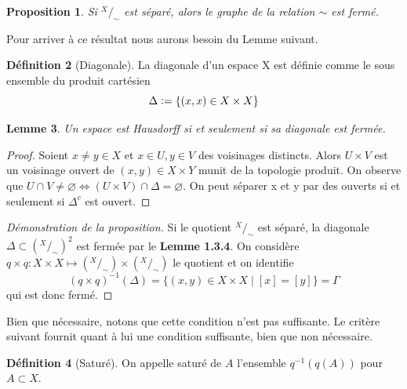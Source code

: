 \documentclass[12pt]{book}
\newcommand{\defeq}{\vcentcolon=}
\newtheorem{lemma}{Lemme}[section]
\newtheorem{prop}[lemma]{Proposition}
\theoremstyle{definition}
\newtheorem{definition}[lemma]{Définition}
\theoremstyle{remark}
\newcommand*\quot[2]{{^{\textstyle #1}\big/_{\textstyle #2}}}
\begin{document}
	\begin{prop}
		Si $\quot{X}{\sim}$ est séparé, alors le graphe de la relation  $\sim$ est fermé.
	\end{prop}
	Pour arriver à ce résultat nous aurons besoin du Lemme suivant.
	\begin{definition}[Diagonale]
		La diagonale d'un espace X est définie comme le sous ensemble du produit cartésien
	\[\Delta \defeq \{(x,x) \in X \times X\}\]
	\end{definition}
	\begin{lemma}
		Un espace est Hausdorff si et seulement si sa diagonale est fermée.
	\end{lemma}
	\begin{proof}
		Soient $x \neq y \in X$ et  $x \in U, y \in V$ des voisinages distincts. Alors  $U\times V$ est un voisinage ouvert de  $(x,y) \in X\times Y$ munit de la topologie produit. On observe que  $U\cap V \neq \varnothing \iff (U\times V) \cap \Delta = \varnothing$. On peut séparer x et y par des ouverts si et seulement si $\Delta^c$ est ouvert.
	\end{proof}
	\begin{proof}[Démonstration de la proposition]
		Si le quotient $\quot{X}{\sim}$ est séparé, la diagonale $\Delta \subset (\quot{X}{\sim})^2$ est fermée par le \textbf{Lemme 1.3.4}. On considère $q\times q : X \times X \longmapsto (\quot{X}{\sim}) \times (\quot{X}{\sim})$ le quotient et on identifie \[
		{(q \times q)}^{-1}(\Delta) = \{(x,y) \in X \times X \;|\; [x] = [y]\} = \Gamma 
		\] qui est donc fermé.	
	\end{proof}
	Bien que nécessaire, notons que cette condition n'est pas suffisante. Le critère suivant fournit quant à lui une condition suffisante, bien que non nécessaire. 
	\begin{definition}[Saturé]
		On appelle saturé de $A$ l'ensemble $q^{-1}(q(A))$ pour  $A \subset X$.
	\end{definition}
\end{document}
